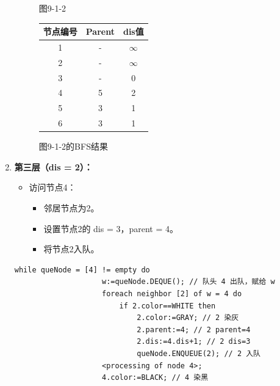 \documentclass{article}
\begin{document}
\begin{enumerate}
\begin{figure}[htbp]
\begin{minipage}[b]{0.6\textwidth}
            \caption{图9-1-2}
            \label{fig:9-1-2}
        \end{minipage}%
        \hfill%
        \begin{minipage}[b]{0.4\textwidth}    %
            \centering
            \begin{tabular}{|c|c|c|}
                \hline
                节点编号 & Parent & dis值 \\
                \hline
                1 & - & $\infty$ \\
                2 & - & $\infty$ \\
                3 & - & 0 \\
                4 & 5 & 2 \\
                5 & 3 & 1 \\
                6 & 3 & 1 \\
                \hline
            \end{tabular}
            \caption{图9-1-2的BFS结果}
            \label{tab:graph9-1-2-bfs}
        \end{minipage}
    \end{figure}
            
    \pagebreak

    \item \textbf{第三层（dis = 2）：}

    \begin{itemize}
        \item 访问节点4：
        \begin{itemize}
            \item 邻居节点为2。
            \item 设置节点2的 dis = 3，parent = 4。
            \item 将节点2入队。
        \end{itemize}
    \end{itemize}

    \begin{lstlisting}[style=algorithmPPT]
                while queNode = [4] != empty do
                    w:=queNode.DEQUE(); // 队头 4 出队，赋给 w
                    foreach neighbor [2] of w = 4 do 
                        if 2.color==WHITE then
                            2.color:=GRAY; // 2 染灰
                            2.parent:=4; // 2 parent=4
                            2.dis:=4.dis+1; // 2 dis=3
                            queNode.ENQUEUE(2); // 2 入队
                    <processing of node 4>;
                    4.color:=BLACK; // 4 染黑        
                \end{lstlisting}    


\end{enumerate}
\end{document}
